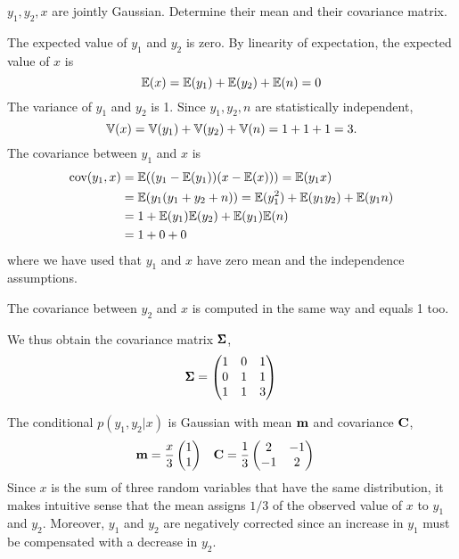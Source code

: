 \begin{exenumerate}

\item $y_1, y_2, x$ are jointly Gaussian. Determine their mean and their
  covariance matrix.

  \begin{solution}
    
    The expected value of $y_1$ and $y_2$ is zero. By linearity of
    expectation, the expected value of $x$ is
    \begin{equation}
      \mathbb{E}(x) = \mathbb{E}(y_1) + \mathbb{E}(y_2) + \mathbb{E}(n) = 0
    \end{equation}
    The variance of $y_1$ and $y_2$ is 1. Since $y_1, y_2, n$ are statistically independent,
    \begin{equation}
      \mathbb{V}(x) = \mathbb{V}(y_1) + \mathbb{V}(y_2) + \mathbb{V}(n) = 1 + 1 + 1 = 3.
    \end{equation}
    The covariance between $y_1$ and $x$ is
    \begin{align}
      \text{cov}(y_1, x) &= \mathbb{E}( (y_1-\mathbb{E}(y_1))(x-\mathbb{E}(x))) = \mathbb{E}( y_1 x) \\
      &= \mathbb{E}( y_1(y_1+y_2+n) ) = \mathbb{E}(y_1^2) + \mathbb{E}(y_1 y_2) + \mathbb{E}(y_1 n)\\
      &= 1 +  \mathbb{E}(y_1)\mathbb{E}(y_2) + \mathbb{E}(y_1)\mathbb{E}(n)\\
      &= 1 + 0 + 0
    \end{align}
    where we have used that $y_1$ and $x$ have zero mean and the independence assumptions.

    The covariance between $y_2$ and $x$ is computed in the same way and equals 1 too.

    We thus obtain the covariance matrix $\pmb{\Sigma}$,
    \begin{equation}
      \pmb{\Sigma} = \begin{pmatrix}
        1 & 0 & 1\\
        0 & 1 & 1\\
        1 & 1 & 3
      \end{pmatrix}
    \end{equation}
    
  \end{solution}

\item The conditional $p(y_1, y_2 | x)$ is Gaussian with mean $\mathbf{m}$ and covariance $\mathbf{C}$,
  \begin{align}
    \mathbf{m} &= \frac{x}{3} \begin{pmatrix}
      1\\
      1
    \end{pmatrix}
    &
    \mathbf{C} & = \frac{1}{3} \begin{pmatrix}
      2 &-1 \\
     -1 & 2
    \end{pmatrix}
  \end{align}
  Since $x$ is the sum of three random variables that have the
  same distribution, it makes intuitive sense that the mean assigns
  $1/3$ of the observed value of $x$ to $y_1$ and $y_2$. Moreover,
  $y_1$ and $y_2$ are negatively corrected since an increase in $y_1$
  must be compensated with a decrease in $y_2$.


\end{exenumerate}
